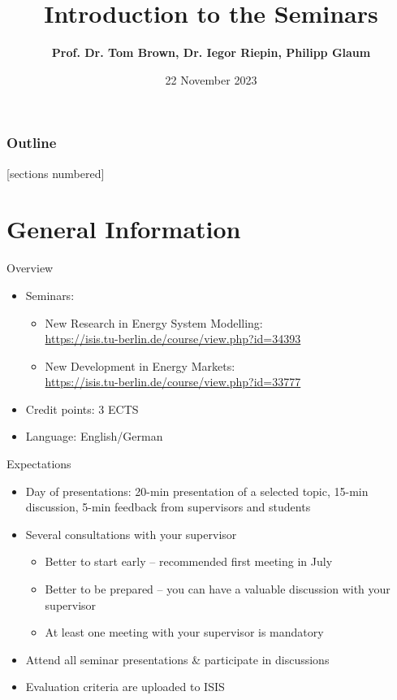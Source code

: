 \documentclass[10pt,aspectratio=169,dvipsnames]{beamer}
\title{Introduction to the Seminars}
\author{\bf Prof. Dr. Tom Brown, Dr. Iegor Riepin, Philipp Glaum}
\institute[Technische Universität Berlin] %
{
  \normalsize
  Technische Universität Berlin\\
  Department of Digital Transformation in Energy Systems \\
  Institute of Energy Technology
}
\date{22 November 2023}
\begin{document}
{
\maketitle
}
\addtocounter{framenumber}{-1}

\begin{frame}
  \frametitle{Outline}
  [sections numbered]
  \tableofcontents[hideallsubsections]
\end{frame}


\section{General Information}

\begin{frame}{Overview}

  \begin{itemize}
    \item Seminars:
          \begin{itemize}
            \item New Research in Energy System Modelling:
                  \\ \href{https://isis.tu-berlin.de/course/view.php?id=34393}{https://isis.tu-berlin.de/course/view.php?id=34393}
            \item New Development in Energy Markets:\\ \href{https://isis.tu-berlin.de/course/view.php?id=33777}{https://isis.tu-berlin.de/course/view.php?id=33777}
          \end{itemize}
    \item Credit points: 3 ECTS
    \item Language: English/German
  \end{itemize}

\end{frame}

\begin{frame}{Expectations}

  \begin{itemize}
    \item Day of presentations: 20-min presentation of a selected topic, 15-min discussion, 5-min feedback from supervisors and students
    \item Several consultations with your supervisor
    \begin{itemize}
        \item Better to start early -- recommended first meeting in July
        \item Better to be prepared -- you can have a valuable discussion with your supervisor
        \item At least one meeting with your supervisor is mandatory
    \end{itemize}
    \item Attend all seminar presentations \&  participate in discussions
    \item Evaluation criteria are uploaded to ISIS
  \end{itemize}

\end{frame}
\end{document}
